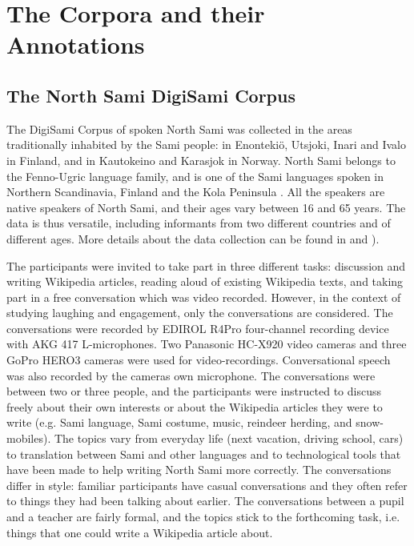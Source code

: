 \section{The Corpora and their Annotations}
\label{sec:corpora-annotations}

\subsection{The North Sami DigiSami Corpus}
\label{sec:digisami-corpus}

The DigiSami Corpus of spoken North Sami was collected in the areas traditionally inhabited by the Sami people: in Enonteki\"{o}, Utsjoki, Inari and Ivalo in Finland, and in Kautokeino and Karasjok in Norway.
North Sami belongs to the Fenno-Ugric language family, and is one of the Sami languages
spoken in Northern Scandinavia, Finland and the Kola Peninsula \cite{Hirvonen:ea:97}.
All the speakers are native speakers of North Sami, and their ages vary between 16 and 65 years.
The data is thus versatile, including informants from two different countries and of different ages.
More details about the data collection can be found in \cite{Jokinen:Wilcock:SLTU:14} and \cite{Jokinen:LREC:14}).

The participants were invited to take part in three different tasks: discussion and writing Wikipedia articles, reading aloud of existing Wikipedia texts, and taking part in a free conversation which was video recorded. However, in the context of studying laughing and engagement, only the conversations are considered.
The conversations were recorded by EDIROL R4Pro four-channel recording device with AKG 417 L-microphones. Two Panasonic HC-X920 video cameras and three GoPro HERO3 cameras were used for video-recordings. Conversational speech was also recorded by the cameras own microphone. The conversations were between two or three people, and the participants were instructed to discuss freely about their own interests or about the Wikipedia articles they were to write (e.g. Sami language, Sami costume, music, reindeer herding, and snow-mobiles). The topics vary from everyday life (next vacation, driving school, cars) to translation between Sami and other languages and to technological tools that have been made to help writing North Sami more correctly. The conversations differ in style: familiar participants have casual conversations and they often refer to things they had been talking about earlier. The conversations between a pupil and a teacher are fairly formal, and the topics stick to the forthcoming task, i.e. things that one could write a Wikipedia article about.

